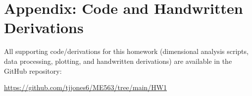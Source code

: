 \documentclass[12pt]{article}
\begin{document}
\appendix
\section*{Appendix: Code and Handwritten Derivations}

All supporting code/derivations for this homework (dimensional analysis scripts, data processing, plotting, 
and handwritten derivations) are available in the GitHub repository:
\begin{center}
    \url{https://github.com/tjjones6/ME563/tree/main/HW1}
\end{center}
\end{document}

